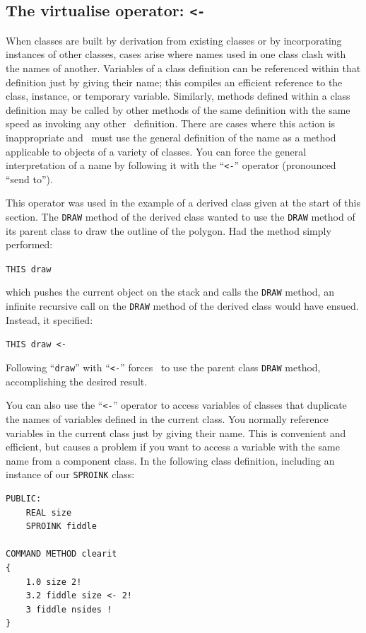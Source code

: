 \documentclass{article}
\begin{document}
\subsection{The virtualise operator: {\tt <-}}

When classes are built by derivation from existing classes or by
incorporating instances of other classes, cases arise where names
used in one class clash with the names of another.  Variables of a
class definition can be referenced within that definition just by
giving their name; this compiles an efficient reference to the class,
instance, or temporary variable.  Similarly, methods defined
within a class definition may be called by other methods of the same
definition with the same speed as invoking any other \atlas\
definition.  There are cases where this action is inappropriate and
\cw\ must use the general definition of the name as a method
applicable to objects of a variety of classes.  You can force the
general interpretation of a name by following it with the ``{\tt <-}''
operator (pronounced ``send to'').

This operator was used in the example of a derived class given at the
start of this section.  The {\tt DRAW} method of the derived class
wanted to use the {\tt DRAW} method of its parent class to draw the
outline of the polygon.  Had the method simply performed:

{\tt THIS draw}

which pushes the current object on the stack and calls the {\tt DRAW}
method, an infinite recursive call on the {\tt DRAW} method of the
derived class would have ensued.  Instead, it specified:

{\tt THIS draw <-}

Following ``{\tt draw}'' with ``{\tt <-}'' forces \cw\ to use the
parent class {\tt DRAW} method, accomplishing the desired result.

You can also use the ``{\tt <-}'' operator to access variables of
classes that duplicate the names of variables defined in the current
class.  You normally reference variables in the current class just
by giving their name.  This is convenient and efficient, but causes a
problem if you want to access a variable with the same name from a
component class.  In the following class definition, including an
instance of our {\tt SPROINK} class:

\begin{verbatim}
PUBLIC:
    REAL size
    SPROINK fiddle

COMMAND METHOD clearit
{
    1.0 size 2!
    3.2 fiddle size <- 2!
    3 fiddle nsides !
}
\end{verbatim}
\end{document}
